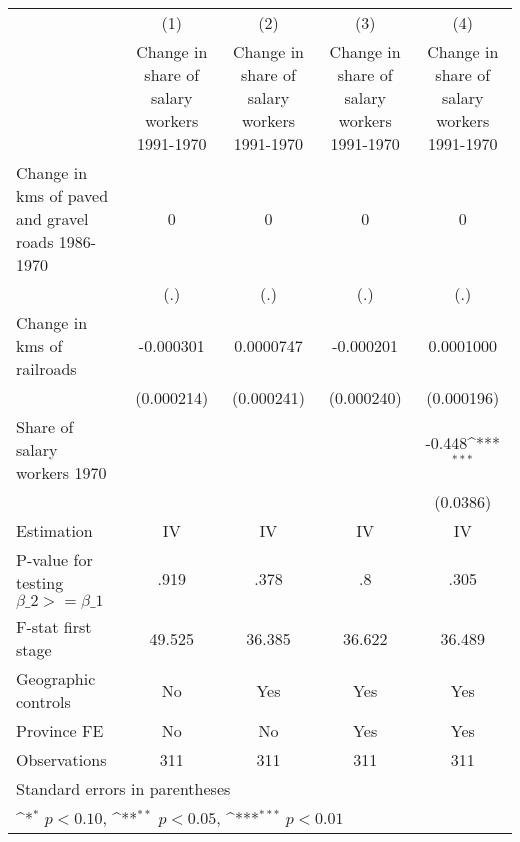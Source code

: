 {
\def\sym#1{\ifmmode^{#1}\else\(^{#1}\)\fi}
\begin{tabular}{l*{4}{c}}
\hline\hline
                    &\multicolumn{1}{c}{(1)}&\multicolumn{1}{c}{(2)}&\multicolumn{1}{c}{(3)}&\multicolumn{1}{c}{(4)}\\
                    &\multicolumn{1}{c}{Change in share of salary workers 1991-1970}&\multicolumn{1}{c}{Change in share of salary workers 1991-1970}&\multicolumn{1}{c}{Change in share of salary workers 1991-1970}&\multicolumn{1}{c}{Change in share of salary workers 1991-1970}\\
\hline
Change in kms of paved and gravel roads 1986-1970&           0         &           0         &           0         &           0         \\
                    &         (.)         &         (.)         &         (.)         &         (.)         \\
[1em]
Change in kms of railroads&   -0.000301         &   0.0000747         &   -0.000201         &   0.0001000         \\
                    &  (0.000214)         &  (0.000241)         &  (0.000240)         &  (0.000196)         \\
[1em]
Share of salary workers 1970&                     &                     &                     &      -0.448\sym{***}\\
                    &                     &                     &                     &    (0.0386)         \\
\hline
Estimation          &          IV         &          IV         &          IV         &          IV         \\
P-value for testing $\beta\_2 >= \beta\_1$&        .919         &        .378         &          .8         &        .305         \\
F-stat first stage  &      49.525         &      36.385         &      36.622         &      36.489         \\
Geographic controls &          No         &         Yes         &         Yes         &         Yes         \\
Province FE         &          No         &          No         &         Yes         &         Yes         \\
Observations        &         311         &         311         &         311         &         311         \\
\hline\hline
\multicolumn{5}{l}{\footnotesize Standard errors in parentheses}\\
\multicolumn{5}{l}{\footnotesize \sym{*} \(p<0.10\), \sym{**} \(p<0.05\), \sym{***} \(p<0.01\)}\\
\end{tabular}
}
